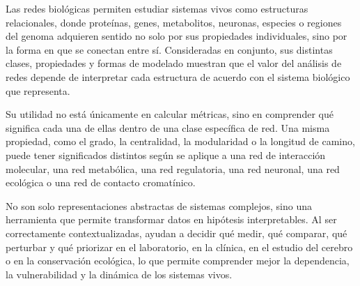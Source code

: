 \documentclass[11pt]{article}
\begin{document}
Las redes biológicas permiten estudiar sistemas vivos como estructuras relacionales, donde proteínas, genes, metabolitos, neuronas, especies o regiones del genoma adquieren sentido no solo por sus propiedades individuales, sino por la forma en que se conectan entre sí. Consideradas en conjunto, sus distintas clases, propiedades y formas de modelado muestran que el valor del análisis de redes depende de interpretar cada estructura de acuerdo con el sistema biológico que representa.

Su utilidad no está únicamente en calcular métricas, sino en comprender qué significa cada una de ellas dentro de una clase específica de red. Una misma propiedad, como el grado, la centralidad, la modularidad o la longitud de camino, puede tener significados distintos según se aplique a una red de interacción molecular, una red metabólica, una red regulatoria, una red neuronal, una red ecológica o una red de contacto cromatínico. 

No son solo representaciones abstractas de sistemas complejos, sino una herramienta que permite transformar datos en hipótesis interpretables. Al ser correctamente contextualizadas, ayudan a decidir qué medir, qué comparar, qué perturbar y qué priorizar en el laboratorio, en la clínica, en el estudio del cerebro o en la conservación ecológica, lo que permite comprender mejor la dependencia, la vulnerabilidad y la dinámica de los sistemas vivos.

\printbibliography[title={Referencias}]
\end{document}
